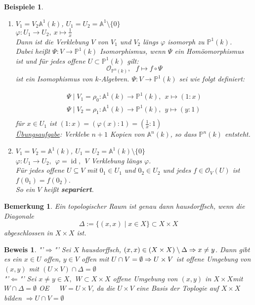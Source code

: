 \documentclass[a4paper,12pt]{report}
\theoremstyle{break}
\newtheorem{Bem}[Def]{Bemerkung}
\newtheorem{Bsp}[Def]{Beispiele}
\theoremstyle{nonumberbreak}
\theoremstyle{nonumberplain}
\newtheorem{Bew}{Beweis}
\newcommand{\emp}[1]{\textbf{\emph{#1}}}
\newcommand{\begriff}[1]{{\index{#1}}\emp{#1}}
\DeclareMathOperator{\id}{id}
\renewcommand{\OE}{O\!\!E~}
\begin{document}
\begin{Bsp}
\begin{enumerate}
\item $V_1=V_2\mathbb{A}^1(k)$, $U_1=U_2=\mathbb{A}^1\setminus\{0\}$\\
$\varphi:U_1\rightarrow U_2,~x\mapsto\frac{1}{x}$\\
Dann ist die Verklebung $V$ von $V_1$ und $V_2$ längs $\varphi$ isomorph zu $\mathbb{P}^1(k)$.\\
Dabei heißt $\Psi:V\rightarrow\mathbb{P}^1(k)$ Isomorphismus, wenn $\Psi$ ein Homöomorphismus ist und für jedes offene $U\subset\mathbb{P}^1(k)$ gilt:
$$\mathcal{O}_{\mathbb{P}^n(k)},~~~f\mapsto f\circ\Psi$$
ist ein Isomophismus von $k$-Algebren.
$\Psi:V\rightarrow\mathbb{P}^1(k)$ sei wie folgt definiert:

\begin{align*}
\Psi\mid V_1=\rho_0:\mathbb{A}^1(k)\rightarrow\mathbb{P}^1(k),~~x\mapsto (1:x)\\
\Psi\mid V_2=\rho_1:\mathbb{A}^1(k)\rightarrow\mathbb{P}^1(k),~~y\mapsto (y:1)\\
\end{align*}
für $x\in U_1$ ist $(1:x)=(\varphi(x):1)=(\frac{1}{x}:1)$\\
\underline{Übungsaufgabe}: Verklebe $n+1$ Kopien von $\mathbb{A}^n(k)$, so dass $\mathbb{P}^n(k)$ entsteht.
\item $V_1=V_2=\mathbb{A}^1(k)$, $U_1=U_2=\mathbb{A}^1(k)\setminus\{0\}$\\
$\varphi:U_1\rightarrow U_2,~~\varphi=\id, ~~V$ Verklebung längs $\varphi$.\\
Für jedes offene $U\subseteq V$ mit $0_1\in U_1$ und $0_2\in U_2$ und jedes $f\in \mathcal{O}_V(U)$ ist $f(0_1)=f(0_2)$.\\
So ein $V$ heißt \begriff{separiert}.
\end{enumerate}
\end{Bsp}

\begin{Bem}
\label{bem:13.3 (Topologische Bemerkung)}
Ein topologischer Raum ist genau dann hausdorffsch, wenn die Diagonale
$$\Delta:=\{(x,x)\mid x\in X\}\subset X\times X$$
abgeschlossen in $X\times X$ ist.
\end{Bem}

\begin{Bew}
"'$\Rightarrow$"' Sei $X$ hausdorffsch, $(x,x)\in (X\times X)\setminus\Delta\\
\Rightarrow x\neq y$. Dann gibt es ein $x\in U$ offen, $y\in V$ offen mit $U\cap V=\emptyset\\
\Rightarrow U\times V$ ist offene Umgebung von $(x,y)$ mit $(U\times V)\cap\Delta=\emptyset$\\
"'$\Leftarrow$"' Sei $x\neq y\in X,~~W\subset X\times X$ offene Umgebung von $(x,y)$ in $X\times X$mit $W\cap \Delta=\emptyset$ \OE~~$W=U\times V$, da die $U\times V$ eine Basis der Toplogie auf $X\times X$ bilden $\Rightarrow U\cap V=\emptyset$ 
\end{Bew}
\end{document}
